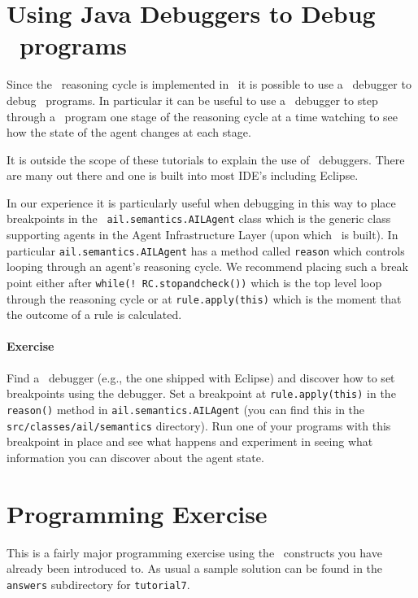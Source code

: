 \documentclass[a4]{article}
\begin{document}
\section{Using Java Debuggers to Debug \gwendolen\ programs}

Since the \gwendolen\ reasoning cycle is implemented in \java\ it is possible to use a \java\ debugger to debug \gwendolen\ programs.  In particular it can be useful to use a \java\ debugger to step through a \gwendolen\ program one stage of the reasoning cycle at a time watching to see how the state of the agent changes at each stage.

It is outside the scope of these tutorials to explain the use of \java\ debuggers.  There are many out there and one is built into most IDE's including Eclipse.

In our experience it is particularly useful when debugging in this way to place breakpoints in the \java\ \texttt{ail.semantics.AILAgent} class which is the generic class supporting agents in the Agent Infrastructure Layer (upon which \gwendolen\ is built).  In particular \texttt{ail.semantics.AILAgent} has a method called \texttt{reason} which controls looping through an agent's reasoning cycle.  We recommend placing such a break point either after \texttt{while(! RC.stopandcheck())} which is the top level loop through the reasoning cycle or at \texttt{rule.apply(this)} which is the moment that the outcome of a rule is calculated.

\paragraph{Exercise} Find a \java\ debugger (e.g., the one shipped with Eclipse) and discover how to set breakpoints using the debugger.  Set a breakpoint at \texttt{rule.apply(this)} in the \texttt{reason()} method in \texttt{ail.semantics.AILAgent} (you can find this in the \texttt{src/classes/ail/semantics} directory).  Run one of your programs with this breakpoint in place and see what happens and experiment in seeing what information you can discover about the agent state.

\section{Programming Exercise}
This is a fairly major programming exercise using the \gwendolen\ constructs you have already been introduced to.  As usual a sample solution can be found in the \texttt{answers} subdirectory for \texttt{tutorial7}.
\end{document}
